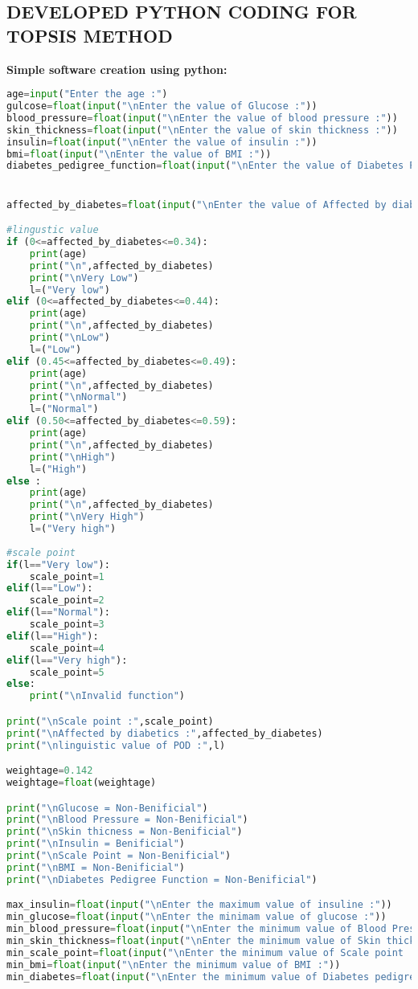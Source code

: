 \documentclass[12pt,a4paper]{article}
\begin{document}
\subsection{DEVELOPED PYTHON CODING FOR TOPSIS METHOD}
\textbf{Simple software creation using python:}
\begin{lstlisting}[language= Python]
age=input("Enter the age :")
gulcose=float(input("\nEnter the value of Glucose :"))
blood_pressure=float(input("\nEnter the value of blood pressure :"))
skin_thickness=float(input("\nEnter the value of skin thickness :"))
insulin=float(input("\nEnter the value of insulin :"))
bmi=float(input("\nEnter the value of BMI :"))
diabetes_pedigree_function=float(input("\nEnter the value of Diabetes Pedigree Function :"))


affected_by_diabetes=float(input("\nEnter the value of Affected by diabetes :"))

#lingustic value 
if (0<=affected_by_diabetes<=0.34):
    print(age)
    print("\n",affected_by_diabetes)
    print("\nVery Low")
    l=("Very low")
elif (0<=affected_by_diabetes<=0.44):
    print(age)
    print("\n",affected_by_diabetes)
    print("\nLow")
    l=("Low")
elif (0.45<=affected_by_diabetes<=0.49):
    print(age)
    print("\n",affected_by_diabetes)
    print("\nNormal")
    l=("Normal")
elif (0.50<=affected_by_diabetes<=0.59):
    print(age)
    print("\n",affected_by_diabetes)
    print("\nHigh")
    l=("High")
else :
    print(age)
    print("\n",affected_by_diabetes)
    print("\nVery High")
    l=("Very high")
 
#scale point  
if(l=="Very low"):
    scale_point=1
elif(l=="Low"):
    scale_point=2
elif(l=="Normal"):
    scale_point=3
elif(l=="High"):
    scale_point=4
elif(l=="Very high"):
    scale_point=5
else:
    print("\nInvalid function")

print("\nScale point :",scale_point)
print("\nAffected by diabetics :",affected_by_diabetes)
print("\nlinguistic value of POD :",l)

weightage=0.142
weightage=float(weightage)

print("\nGlucose = Non-Benificial")
print("\nBlood Pressure = Non-Benificial")
print("\nSkin thicness = Non-Benificial")
print("\nInsulin = Benificial")
print("\nScale Point = Non-Benificial")
print("\nBMI = Non-Benificial")
print("\nDiabetes Pedigree Function = Non-Benificial")

max_insulin=float(input("\nEnter the maximum value of insuline :"))
min_glucose=float(input("\nEnter the minimam value of glucose :"))
min_blood_pressure=float(input("\nEnter the minimum value of Blood Pressure :"))
min_skin_thickness=float(input("\nEnter the minimum value of Skin thickness :"))
min_scale_point=float(input("\nEnter the minimum value of Scale point :"))
min_bmi=float(input("\nEnter the minimum value of BMI :"))
min_diabetes=float(input("\nEnter the minimum value of Diabetes pedigree function :"))


\end{lstlisting}
\end{document}
